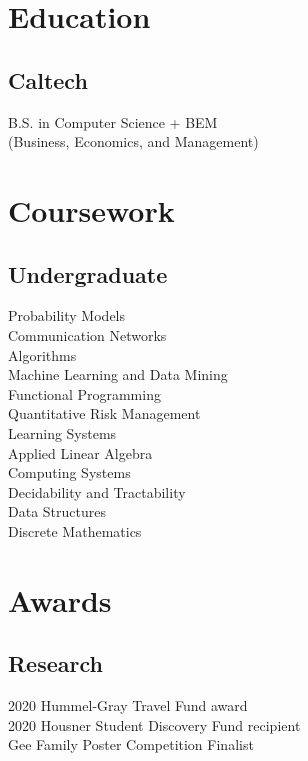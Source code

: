 \documentclass[]{deedy-resume-openfont}
\begin{document}
\begin{minipage}[t]{0.33\textwidth} 


\section{Education}

\subsection{Caltech}
B.S. in Computer Science + BEM \\ (Business, Economics, and Management)

\sectionsep



\section{Coursework}
\subsection{Undergraduate}
Probability Models \\
Communication Networks \\
Algorithms \\
Machine Learning and Data Mining \\
Functional Programming \\
Quantitative Risk Management \\
Learning Systems \\
Applied Linear Algebra \\
Computing Systems \\
Decidability and Tractability \\
Data Structures \\
Discrete Mathematics \\

\sectionsep
\section{Awards}
\subsection{Research}
\textbullet{} 2020 Hummel-Gray Travel Fund award \\
\textbullet{} 2020 Housner Student Discovery Fund recipient \\
\textbullet{} Gee Family Poster Competition Finalist


\end{minipage}
\end{document}
